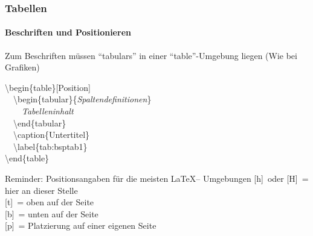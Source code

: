 \begin{frame}
\frametitle{Tabellen}
\framesubtitle{Beschriften und Positionieren}
Zum Beschriften müssen "`tabulars"' in einer "`table"'-Umgebung liegen (Wie bei Grafiken)\\ 

\medskip

\color{unibablueI}\begin{ttfamily}\textbackslash begin\color{black}\{table\}\color{nounibagreenI}[Position]\color{black}\\
~~\color{unibablueI}\textbackslash begin\color{black}\{tabular\}\{\textit{Spaltendefinitionen}\}\\
~~~~\textit{Tabelleninhalt}\\
~~\color{unibablueI}\textbackslash end\color{black}\{tabular\}\\
~~\color{nounibaredI}\textbackslash caption\color{black}\{Untertitel\}\\
~~\color{nounibaredI}\textbackslash label\color{black}\{tab:bsptab1\}\\
\color{unibablueI}\textbackslash end\color{black}\{table\}\\
\end{ttfamily}

\medskip

\begin{block}{Reminder: Positionsangaben f\"ur die meisten \LaTeX -- Umgebungen}
\color{nounibagreenI}[h]\color{black}~oder \color{nounibagreenI}[H]\color{black}~= hier an dieser Stelle\\
\color{nounibagreenI}[t]\color{black}~= oben auf der Seite\\ 
\color{nounibagreenI}[b]\color{black}~= unten auf der Seite\\ 
\color{nounibagreenI}[p]\color{black}~= Platzierung auf einer eigenen Seite
\end{block}
\end{frame}



